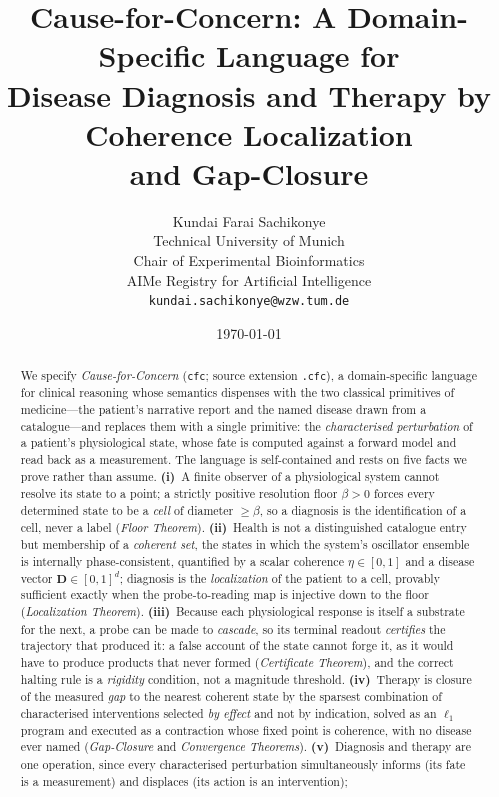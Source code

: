 \documentclass[11pt,a4paper]{article}
\title{\textbf{Cause-for-Concern: A Domain-Specific Language for\\[2pt]
Disease Diagnosis and Therapy by Coherence Localization\\
and Gap-Closure}}
\author{%
Kundai Farai Sachikonye\\
\small Technical University of Munich\\
\small Chair of Experimental Bioinformatics\\
\small AIMe Registry for Artificial Intelligence\\
\small \texttt{kundai.sachikonye@wzw.tum.de}}
\date{\today}
\theoremstyle{cfcthm}
\theoremstyle{definition}
\theoremstyle{remark}
\newcommand{\flo}{\beta}                %
\newcommand{\ecoh}{\eta}                %
\newcommand{\dvec}{\mathbf{D}}          %
\newcommand{\cf}[1]{\texttt{#1}}
\begin{document}
\maketitle

\begin{abstract}
\noindent
We specify \emph{Cause-for-Concern} (\cf{cfc}; source extension \cf{.cfc}),
a domain-specific language for clinical reasoning whose semantics dispenses
with the two classical primitives of medicine---the patient's narrative
report and the named disease drawn from a catalogue---and replaces them with
a single primitive: the \emph{characterised perturbation} of a patient's
physiological state, whose fate is computed against a forward model and read
back as a measurement. The language is self-contained and rests on five facts
we prove rather than assume. \textbf{(i)}~A finite observer of a physiological
system cannot resolve its state to a point; a strictly positive resolution
floor $\flo>0$ forces every determined state to be a \emph{cell} of diameter
$\ge\flo$, so a diagnosis is the identification of a cell, never a label
(\emph{Floor Theorem}). \textbf{(ii)}~Health is not a distinguished catalogue
entry but membership of a \emph{coherent set}, the states in which the
system's oscillator ensemble is internally phase-consistent, quantified by a
scalar coherence $\ecoh\in[0,1]$ and a disease vector
$\dvec\in[0,1]^{d}$; diagnosis is the \emph{localization} of the patient to a
cell, provably sufficient exactly when the probe-to-reading map is injective
down to the floor (\emph{Localization Theorem}). \textbf{(iii)}~Because each
physiological response is itself a substrate for the next, a probe can be made
to \emph{cascade}, so its terminal readout \emph{certifies} the trajectory
that produced it: a false account of the state cannot forge it, as it would
have to produce products that never formed (\emph{Certificate Theorem}), and
the correct halting rule is a \emph{rigidity} condition, not a magnitude
threshold. \textbf{(iv)}~Therapy is closure of the measured \emph{gap} to the
nearest coherent state by the sparsest combination of characterised
interventions selected \emph{by effect} and not by indication, solved as an
$\ell_{1}$ program and executed as a contraction whose fixed point is
coherence, with no disease ever named (\emph{Gap-Closure} and
\emph{Convergence Theorems}). \textbf{(v)}~Diagnosis and therapy are one
operation, since every characterised perturbation simultaneously informs
(its fate is a measurement) and displaces (its action is an intervention);

\end{abstract}
\end{document}
